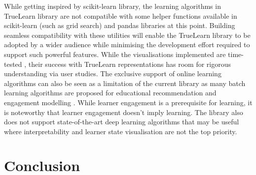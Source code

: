 \documentclass[letterpaper]{article} %
\begin{document}
{While getting inspired by scikit-learn library, the learning algorithms in TrueLearn library are not compatible with some helper functions available in scikit-learn (such as grid search) and pandas libraries at this point. Building seamless compatibility with these utilities will enable the TrueLearn library to be adopted by a wider audience while minimising the development effort required to support such powerful features. While the visualisations implemented are time-tested \cite{visualisationscomparison,mti6060042}, their success with TrueLearn representations has room for rigorous understanding via user studies. The exclusive support of online learning algorithms can also be seen as a limitation of the current library as many batch learning algorithms are proposed for educational recommendation and engagement modelling \cite{intervention_bkt,ensemble_kt}. While learner engagement is a prerequisite for learning, it is noteworthy that learner engagement doesn't imply learning. The library also does not support state-of-the-art deep learning algorithms \cite{deep_kt,pardos_serendipity} that may be useful where interpretability and learner state visualisation are not the top priority.}




\section{Conclusion}
\end{document}
